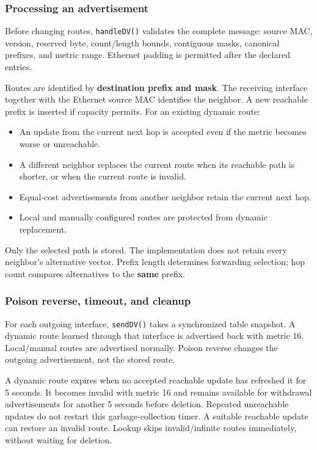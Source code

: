 \documentclass[
  a4paper,
  10pt]{article}
\providecommand{\tightlist}{%
  \setlength{\itemsep}{0pt}\setlength{\parskip}{0pt}}
\begin{document}
\subsubsection{Processing an
advertisement}\label{processing-an-advertisement}

Before changing routes, \texttt{handleDV()} validates the complete
message: source MAC, version, reserved byte, count/length bounds,
contiguous masks, canonical prefixes, and metric range. Ethernet padding
is permitted after the declared entries.

Routes are identified by \textbf{destination prefix and mask}. The
receiving interface together with the Ethernet source MAC identifies the
neighbor. A new reachable prefix is inserted if capacity permits. For an
existing dynamic route:

\begin{itemize}
\tightlist
\item
  An update from the current next hop is accepted even if the metric
  becomes worse or unreachable.
\item
  A different neighbor replaces the current route when its reachable
  path is shorter, or when the current route is invalid.
\item
  Equal-cost advertisements from another neighbor retain the current
  next hop.
\item
  Local and manually configured routes are protected from dynamic
  replacement.
\end{itemize}

Only the selected path is stored. The implementation does not retain
every neighbor's alternative vector. Prefix length determines forwarding
selection; hop count compares alternatives to the \textbf{same} prefix.

\subsubsection{Poison reverse, timeout, and
cleanup}\label{poison-reverse-timeout-and-cleanup}

For each outgoing interface, \texttt{sendDV()} takes a synchronized
table snapshot. A dynamic route learned through that interface is
advertised back with metric 16. Local/manual routes are advertised
normally. Poison reverse changes the outgoing advertisement, not the
stored route.

A dynamic route expires when no accepted reachable update has refreshed
it for 5 seconds. It becomes invalid with metric 16 and remains
available for withdrawal advertisements for another 5 seconds before
deletion. Repeated unreachable updates do not restart this
garbage-collection timer. A suitable reachable update can restore an
invalid route. Lookup skips invalid/infinite routes immediately, without
waiting for deletion.
\end{document}
